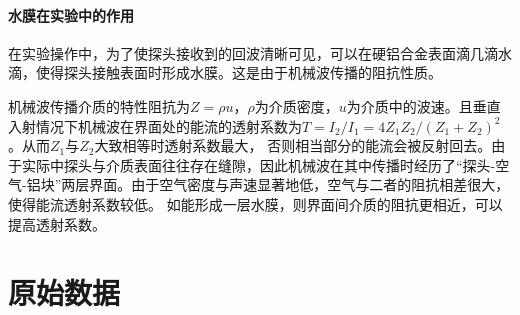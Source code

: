 \documentclass[UTF8,a4paper]{article}%
\begin{document}
\paragraph{水膜在实验中的作用}
在实验操作中，为了使探头接收到的回波清晰可见，可以在硬铝合金表面滴几滴水滴，使得探头接触表面时形成水膜。这是由于机械波传播的阻抗性质。

机械波传播介质的特性阻抗为$Z=\rho u$，$\rho$为介质密度，$u$为介质中的波速。且垂直入射情况下机械波在界面处的能流的透射系数为$T=I_2/I_1=4Z_1Z_2/(Z_1+Z_2)^2$。从而$Z_1$与$Z_2$大致相等时透射系数最大，
否则相当部分的能流会被反射回去。由于实际中探头与介质表面往往存在缝隙，因此机械波在其中传播时经历了“探头-空气-铝块”两层界面。由于空气密度与声速显著地低，空气与二者的阻抗相差很大，使得能流透射系数较低。
如能形成一层水膜，则界面间介质的阻抗更相近，可以提高透射系数。
\appendix
\section{原始数据}
\end{document}
